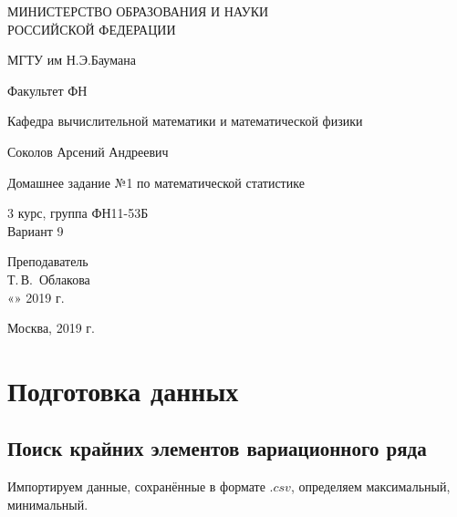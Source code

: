 \documentclass[14pt,a4paper]{scrartcl}
\begin{document}
	\begin{titlepage}
	\begin{center}
		\large
		МИНИСТЕРСТВО ОБРАЗОВАНИЯ И НАУКИ\\ РОССИЙСКОЙ ФЕДЕРАЦИИ
		
		\vspace{0.5cm}
		
		МГТУ им Н.Э.Баумана
		\vspace{0.25cm}
		
		Факультет ФН
		
		Кафедра вычислительной математики и математической физики
		\vfill
		
		
		Соколов Арсений Андреевич\\
		\vfill
		
		
		{\LARGE Домашнее задание №1 по математической статистике\\[2mm]
		}
		\bigskip
		
		3 курс, группа ФН11-53Б\\
		Вариант 9
	\end{center}
	\vfill
	
	\newlength{\ML}
	\hfill\begin{minipage}{0.4\textwidth}
		Преподаватель\\
		\underline{\hspace{3cm}} Т.\,В.~Облакова\\
		«\underline{\hspace{0.7cm}}» \underline{\hspace{1.71cm}} 2019 г.
	\end{minipage}%
	\bigskip
	
	
	\vfill
	
	\begin{center}
		Москва, 2019 г.
	\end{center}
\end{titlepage}

\section{Подготовка данных}
\subsection{Поиск крайних элементов вариационного ряда}
Импортируем данные, сохранённые в формате $.csv$, определяем максимальный, минимальный.
\end{document}
